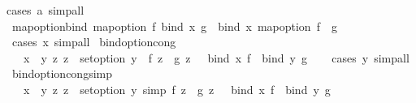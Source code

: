 \begin{isabellebody}
%
\isadelimproof
%
\endisadelimproof
%
\isatagproof
{}\isamarkupfalse%
{\isacharparenleft}{\kern0pt}cases\ a{\isacharparenright}{\kern0pt}\ simp{\isacharunderscore}{\kern0pt}all%
\endisatagproof
{\isafoldproof}%
%
\isadelimproof
\isanewline
%
\endisadelimproof
\isanewline
{}\isamarkupfalse%
\ map{\isacharunderscore}{\kern0pt}option{\isacharunderscore}{\kern0pt}bind{\isacharcolon}{\kern0pt}\ {\isachardoublequoteopen}map{\isacharunderscore}{\kern0pt}option\ f\ {\isacharparenleft}{\kern0pt}bind\ x\ g{\isacharparenright}{\kern0pt}\ {\isacharequal}{\kern0pt}\ bind\ x\ {\isacharparenleft}{\kern0pt}map{\isacharunderscore}{\kern0pt}option\ f\ {\isasymcirc}\ g{\isacharparenright}{\kern0pt}{\isachardoublequoteclose}\isanewline
%
\isadelimproof
\ \ %
\endisadelimproof
%
\isatagproof
{}\isamarkupfalse%
\ {\isacharparenleft}{\kern0pt}cases\ x{\isacharparenright}{\kern0pt}\ simp{\isacharunderscore}{\kern0pt}all%
\endisatagproof
{\isafoldproof}%
%
\isadelimproof
\isanewline
%
\endisadelimproof
\isanewline
{}\isamarkupfalse%
\ bind{\isacharunderscore}{\kern0pt}option{\isacharunderscore}{\kern0pt}cong{\isacharcolon}{\kern0pt}\isanewline
\ \ {\isachardoublequoteopen}{\isasymlbrakk}\ x\ {\isacharequal}{\kern0pt}\ y{\isacharsemicolon}{\kern0pt}\ {\isasymAnd}z{\isachardot}{\kern0pt}\ z\ {\isasymin}\ set{\isacharunderscore}{\kern0pt}option\ y\ {\isasymLongrightarrow}\ f\ z\ {\isacharequal}{\kern0pt}\ g\ z\ {\isasymrbrakk}\ {\isasymLongrightarrow}\ bind\ x\ f\ {\isacharequal}{\kern0pt}\ bind\ y\ g{\isachardoublequoteclose}\isanewline
%
\isadelimproof
\ \ %
\endisadelimproof
%
\isatagproof
{}\isamarkupfalse%
\ {\isacharparenleft}{\kern0pt}cases\ y{\isacharparenright}{\kern0pt}\ simp{\isacharunderscore}{\kern0pt}all%
\endisatagproof
{\isafoldproof}%
%
\isadelimproof
\isanewline
%
\endisadelimproof
\isanewline
{}\isamarkupfalse%
\ bind{\isacharunderscore}{\kern0pt}option{\isacharunderscore}{\kern0pt}cong{\isacharunderscore}{\kern0pt}simp{\isacharcolon}{\kern0pt}\isanewline
\ \ {\isachardoublequoteopen}{\isasymlbrakk}\ x\ {\isacharequal}{\kern0pt}\ y{\isacharsemicolon}{\kern0pt}\ {\isasymAnd}z{\isachardot}{\kern0pt}\ z\ {\isasymin}\ set{\isacharunderscore}{\kern0pt}option\ y\ {\isacharequal}{\kern0pt}simp{\isacharequal}{\kern0pt}{\isachargreater}{\kern0pt}\ f\ z\ {\isacharequal}{\kern0pt}\ g\ z\ {\isasymrbrakk}\ {\isasymLongrightarrow}\ bind\ x\ f\ {\isacharequal}{\kern0pt}\ bind\ y\ g{\isachardoublequoteclose}\isanewline
%
\isadelimproof
\ \ %
\endisadelimproof
%
\isatagproof
{}\isamarkupfalse%

\end{isabellebody}
